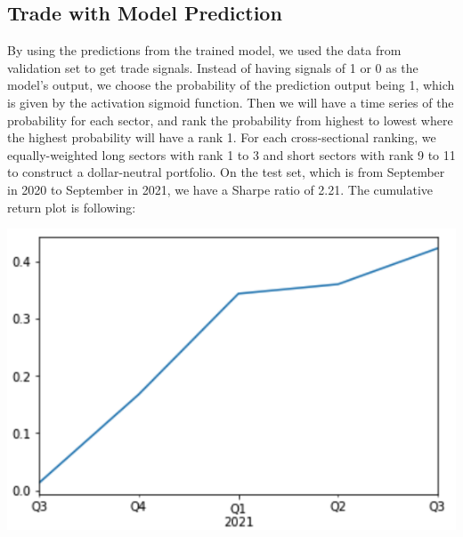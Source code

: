\documentclass{article}
\begin{document}
\subsection{Trade with Model Prediction}
By using the predictions from the trained model, we used the data from validation set to get trade signals. Instead of having signals of 1 or 0 as the model's output, we choose the probability of the prediction output being 1, which is given by the activation sigmoid function. Then we will have a time series of the probability for each sector, and rank the probability from highest to lowest where the highest probability will have a rank 1. For each cross-sectional ranking, we equally-weighted long sectors with rank 1 to 3 and short sectors with rank 9 to 11 to construct a dollar-neutral portfolio. On the test set, which is from September in 2020 to September in 2021, we have a Sharpe ratio of 2.21. The cumulative return plot is following:
\begin{center}
\includegraphics[scale=0.4]{trade_on_model.png}
\end{center}
\end{document}
